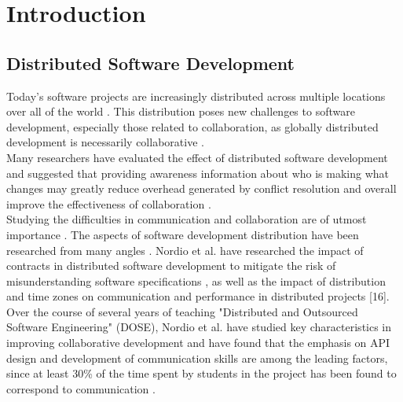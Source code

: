 

\chapter{Introduction}\label{introduction}

\section{Distributed Software Development}

Today's software projects are increasingly distributed across multiple locations over all of the world \cite{ref1, ref2}.  This distribution poses new challenges to software development, especially those related to collaboration, as globally distributed development is necessarily collaborative  \cite{ref3}. \\



Many researchers have evaluated the effect of distributed software development  \cite{ref5, ref6, ref8} and suggested that providing awareness information about who is making what changes may greatly reduce overhead generated by conflict resolution and overall improve the effectiveness of collaboration  \cite{ref3, ref4}. \\



Studying the difficulties in communication and collaboration are of utmost importance  \cite{ref10, ref2}. The aspects of software development distribution have been researched from many angles  \cite{ref14, ref15, ref10}. Nordio et al. have researched the impact of contracts in distributed software development to mitigate the risk of misunderstanding software specifications  \cite{ref9}, as well as the impact of distribution and time zones on  communication and performance in distributed projects [16]. \\



Over the course of several years of teaching "Distributed and Outsourced Software Engineering" (DOSE), Nordio et al. have studied key characteristics in improving collaborative development and have found that the emphasis on API design and development of communication skills are among the leading factors, since at least 30\% of the time spent by students in the project has been found to correspond to communication \cite{ref19, ref20}.


